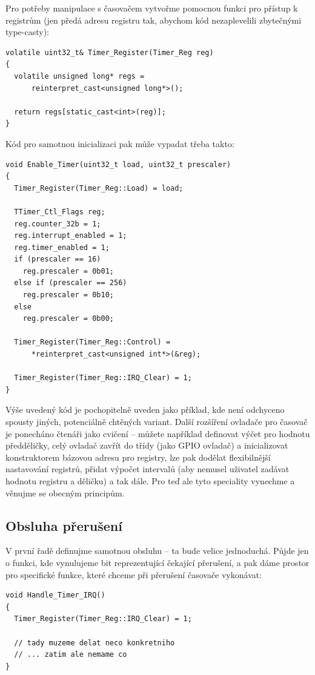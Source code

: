 \documentclass{article}
\begin{document}
Pro potřeby manipulace s časovačem vytvořme pomocnou funkci pro přístup k registrům (jen předá adresu registru tak, abychom kód nezaplevelili zbytečnými type-casty):
\begin{lstlisting}
volatile uint32_t& Timer_Register(Timer_Reg reg)
{
  volatile unsigned long* regs =
      reinterpret_cast<unsigned long*>();

  return regs[static_cast<int>(reg)];
}
\end{lstlisting}
Kód pro samotnou inicializaci pak může vypadat třeba takto:
\begin{lstlisting}
void Enable_Timer(uint32_t load, uint32_t prescaler)
{
  Timer_Register(Timer_Reg::Load) = load;
  
  TTimer_Ctl_Flags reg;
  reg.counter_32b = 1;
  reg.interrupt_enabled = 1;
  reg.timer_enabled = 1;
  if (prescaler == 16)
    reg.prescaler = 0b01;
  else if (prescaler == 256)
    reg.prescaler = 0b10;
  else
    reg.prescaler = 0b00;
    
  Timer_Register(Timer_Reg::Control) =
      *reinterpret_cast<unsigned int*>(&reg);
      
  Timer_Register(Timer_Reg::IRQ_Clear) = 1;
}
\end{lstlisting}
Výše uvedený kód je pochopitelně uveden jako příklad, kde není odchyceno spousty jiných, potenciálně chtěných variant. Další rozšíření ovladače pro časovač je ponecháno čtenáři jako cvičení -- můžete například definovat výčet pro hodnotu předděličky, celý ovladač zavřít do třídy (jako GPIO ovladač) a inicializovat konstruktorem bázovou adresu pro registry, lze pak dodělat flexibilnější nastavování registrů, přidat výpočet intervalů (aby nemusel uživatel zadávat hodnotu registru a děličku) a tak dále. Pro teď ale tyto speciality vynechme a věnujme se obecným principům.

\subsection{Obsluha přerušení}

V první řadě definujme samotnou obsluhu -- ta bude velice jednoduchá. Půjde jen o funkci, kde vynulujeme bit reprezentující čekající přerušení, a pak dáme prostor pro specifické funkce, které chceme při přerušení časovače vykonávat:

\begin{lstlisting}
void Handle_Timer_IRQ()
{
  Timer_Register(Timer_Reg::IRQ_Clear) = 1;
  
  // tady muzeme delat neco konkretniho
  // ... zatim ale nemame co
}
\end{lstlisting}
\end{document}
